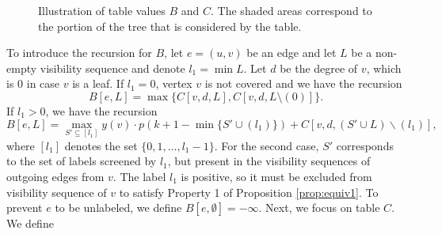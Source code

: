 \documentclass[11pt]{article}
\newcommand\+{\mkern2mu}
\begin{document}
\begin{figure}[htb]
\begin{subfigure}[t]{0.45\textwidth}

     \end{subfigure}
    \caption{Illustration of table values $B$ and $C$. The shaded areas correspond to the portion of the tree that is considered by the table.}
    \label{fig:main}
\end{figure}

To introduce the recursion for $B$, let $e=(u, v)$ be an edge and let $L$ be a non-empty visibility sequence and denote $l_1=\min L$. Let $d$ be the degree of $v$, which is $0$ in case $v$ is a leaf. If $l_1=0$, vertex $v$ is not covered and we have the recursion
\begin{equation} \label{eq: table B0}
    B[e, L] = \max\{C[v,d,L], C[v,d,L\setminus(0)]\}.
\end{equation}
If $l_1>0$, we have the recursion
\begin{equation} \label{eq: table B1}    
B[e, L] = 
        \max_{S' \subseteq [l_1]} y(v) \cdot p(k+1-\min\{S' \cup (l_1)\}) + C[v, d, (S' \cup L) \backslash (l_1)],
\end{equation}
where $[l_1]$ denotes the set $\{0,1,\ldots,l_1-1\}$.  For the second case, $S'$ corresponds to the set of labels screened by $l_1$, but present in the visibility sequences of outgoing edges from $v$. The label $l_1$ is positive, so it must be excluded from visibility sequence of $v$ to satisfy Property 1 of Proposition \ref{prop:equiv1}. To prevent $e$ to be unlabeled, we define $B[e, \emptyset] = -\infty$. Next, we focus on table $C$. We define
\end{document}

